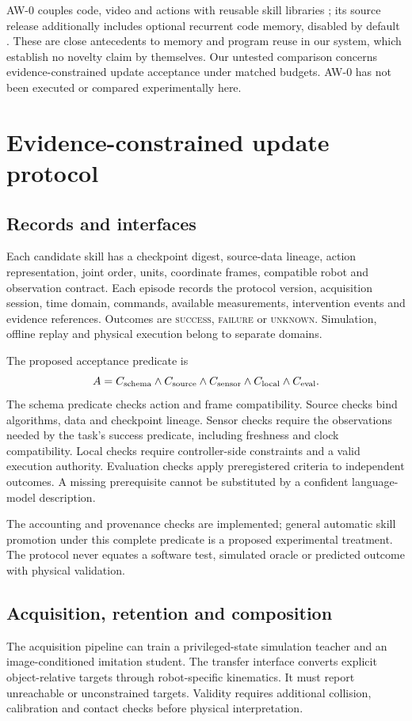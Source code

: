 \documentclass[conference]{IEEEtran}
\begin{document}
AW-0 couples code, video and actions with reusable skill libraries \citep{aw0}; its source release additionally includes optional recurrent code memory, disabled by default \citep{aw0code}. These are close antecedents to memory and program reuse in our system, which establish no novelty claim by themselves. Our untested comparison concerns evidence-constrained update acceptance under matched budgets. AW-0 has not been executed or compared experimentally here.

\section{Evidence-constrained update protocol}
\subsection{Records and interfaces}
Each candidate skill has a checkpoint digest, source-data lineage, action representation, joint order, units, coordinate frames, compatible robot and observation contract. Each episode records the protocol version, acquisition session, time domain, commands, available measurements, intervention events and evidence references. Outcomes are \textsc{success}, \textsc{failure} or \textsc{unknown}. Simulation, offline replay and physical execution belong to separate domains.

The proposed acceptance predicate is
\begin{equation}
 A = C_{\rm schema}\wedge C_{\rm source}\wedge C_{\rm sensor}
     \wedge C_{\rm local}\wedge C_{\rm eval}.
\end{equation}
The schema predicate checks action and frame compatibility. Source checks bind algorithms, data and checkpoint lineage. Sensor checks require the observations needed by the task's success predicate, including freshness and clock compatibility. Local checks require controller-side constraints and a valid execution authority. Evaluation checks apply preregistered criteria to independent outcomes. A missing prerequisite cannot be substituted by a confident language-model description.

The accounting and provenance checks are implemented; general automatic skill promotion under this complete predicate is a proposed experimental treatment. The protocol never equates a software test, simulated oracle or predicted outcome with physical validation.

\subsection{Acquisition, retention and composition}
The acquisition pipeline can train a privileged-state simulation teacher and an image-conditioned imitation student. The transfer interface converts explicit object-relative targets through robot-specific kinematics. It must report unreachable or unconstrained targets. Validity requires additional collision, calibration and contact checks before physical interpretation.
\end{document}
